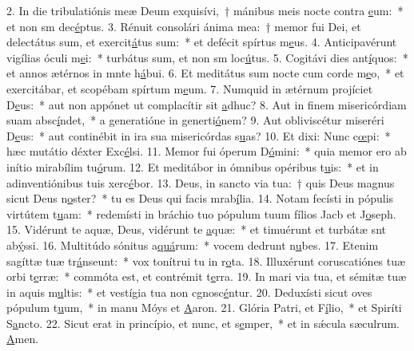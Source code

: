 2. In die tribulatiónis meæ Deum exquisívi,~† mánibus meis nocte contra \uline{e}um:~* et non sm dec\uline{é}ptus.
3. Rénuit consolári ánima mea:~† memor fui Dei, et delectátus sum, et exercit\uline{á}tus sum:~* et defécit spírtus m\uline{e}us.
4. Anticipavérunt vigílias óculi m\uline{e}i:~* turbátus sum, et non sm loc\uline{ú}tus.
5. Cogitávi dies ant\uline{í}quos:~* et annos ætérnos in mnte h\uline{á}bui.
6. Et meditátus sum nocte cum corde m\uline{e}o,~* et exercitábar, et scopébam spírtum m\uline{e}um.
7. Numquid in ætérnum projíciet D\uline{e}us:~* aut non appónet ut complacítir sit \uline{a}dhuc?
8. Aut in finem misericórdiam suam absc\uline{í}ndet,~* a generatióne in generti\uline{ó}nem?
9. Aut obliviscétur miseréri D\uline{e}us:~* aut continébit in ira sua misericórdas s\uline{u}as?
10. Et dixi: Nunc c\uline{œ}pi:~* hæc mutátio déxter Exc\uline{é}lsi.
11. Memor fui óperum D\uline{ó}mini:~* quia memor ero ab inítio mirabílim tu\uline{ó}rum.
12. Et meditábor in ómnibus opéribus t\uline{u}is:~* et in adinventiónibus tuis xerc\uline{é}bor.
13. Deus, in sancto via tua:~† quis Deus magnus sicut Deus n\uline{o}ster?~* tu es Deus qui facis mrab\uline{í}lia.
14. Notam fecísti in pópulis virtútem t\uline{u}am:~* redemísti in bráchio tuo pópulum tuum fílios Jacb et J\uline{o}seph.
15. Vidérunt te aquæ, Deus, vidérunt te \uline{a}quæ:~* et timuérunt et turbátæ snt ab\uline{ý}ssi.
16. Multitúdo sónitus a\uline{quá}rum:~* vocem dedrunt n\uline{u}bes.
17. Etenim sagíttæ tuæ tr\uline{á}nseunt:~* vox tonítrui tu in r\uline{o}ta.
18. Illuxérunt coruscatiónes tuæ orbi t\uline{e}rræ:~* commóta est, et contrémit t\uline{e}rra.
19. In mari via tua, et sémitæ tuæ in aquis m\uline{u}ltis:~* et vestígia tua non cgnosc\uline{é}ntur.
20. Deduxísti sicut oves pópulum t\uline{u}um,~* in manu Móys et \uline{A}aron.
21. Glória Patri, et F\uline{í}lio,~* et Spiríti S\uline{a}ncto.
22. Sicut erat in princípio, et nunc, et s\uline{e}mper,~* et in sǽcula sæculrum. \uline{A}men.
